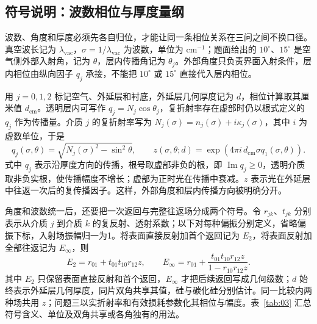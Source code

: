 \subsection{符号说明：波数相位与厚度量纲}
\label{sec:thickness-quantities}

波数、角度和厚度必须先各自归位，才能让同一条相位关系在三问之间不换口径。真空波长记为 $\lambda_{\mathrm{vac}}$，$\sigma=1/\lambda_{\mathrm{vac}}$ 为波数，单位为 $\mathrm{cm}^{-1}$；题面给出的 $10^\circ$、$15^\circ$ 是空气侧外部入射角，记为 $\theta$，层内传播角记为 $\theta_j$。外部角度只负责界面入射条件，层内相位由纵向因子 $q_j$ 承接，不能把 $10^\circ$ 或 $15^\circ$ 直接代入层内相位。

用 $j=0,1,2$ 标记空气、外延层和衬底，外延层几何厚度记为 $d$，相位计算取其厘米值 $d_{\mathrm{cm}}$。透明层内可写作 $q_j=N_j\cos\theta_j$，复折射率存在虚部时仍以根式定义的 $q_j$ 作为传播量。介质 $j$ 的复折射率写为 $N_j(\sigma)=n_j(\sigma)+i\kappa_j(\sigma)$，其中 $i$ 为虚数单位，于是
\begin{equation}
q_j(\sigma,\theta)=\sqrt{N_j(\sigma)^2-\sin^2\theta},\qquad
z(\sigma,\theta;d)=\exp\!\left(4\pi i\,d_{\mathrm{cm}}\sigma q_1(\sigma,\theta)\right).
\end{equation}
式中 $q_j$ 表示沿厚度方向的传播，根号取虚部非负的根，即 $\operatorname{Im}q_j\ge0$，透明介质取非负实根，使传播幅度不增长；虚部为正时光在传播中衰减。$z$ 表示光在外延层中往返一次后的复传播因子。这样，外部角度和层内传播方向被明确分开。

角度和波数统一后，还要把一次返回与完整往返场分成两个符号。令 $r_{jk}$、$t_{jk}$ 分别表示从介质 $j$ 到介质 $k$ 的复反射、透射系数；以下对每种偏振分别定义，省略偏振下标，入射场振幅归一为1。将表面直接反射加首个返回记为 $E_2$，将表面反射加全部往返记为 $E_\infty$，则
\begin{equation}
E_2=r_{01}+t_{01}t_{10}r_{12}z,\qquad
E_\infty=r_{01}+\frac{t_{01}t_{10}r_{12}z}{1-r_{10}r_{12}z}.
\end{equation}
其中 $E_2$ 只保留表面直接反射和首个返回，$E_\infty$ 才把后续返回写成几何级数；$d$ 始终表示外延层几何厚度，同片双角共享其值，硅与碳化硅分别估计。同一比较内两种场共用 $z$；问题三以实折射率和有效损耗参数化其相位与幅度。表~\ref{tab:03} 汇总符号含义、单位及双角共享或各角独有的用法。

